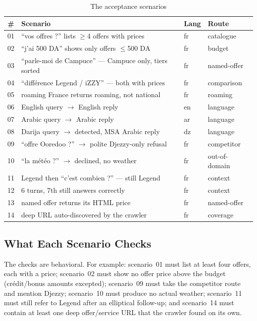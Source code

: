 \documentclass[12pt, a4paper]{report}
\newcommand{\humantext}[1]{#1}      %
\begin{document}
\begin{table}[H]
\centering
\caption{The \numTestsTotal{} acceptance scenarios}
\label{tab:scenarios}
\begin{tabularx}{\textwidth}{c X l l}
\toprule
\textbf{\#} & \textbf{Scenario} & \textbf{Lang} & \textbf{Route} \\
\midrule
01 & ``vos offres ?'' lists $\ge$4 offers with prices            & fr & catalogue \\
02 & ``j'ai 500 DA'' shows only offers $\le$500 DA               & fr & budget \\
03 & ``parle-moi de Campuce'' --- Campuce only, tiers sorted     & fr & named-offer \\
04 & ``différence Legend / iZZY'' --- both with prices           & fr & comparison \\
05 & roaming France returns roaming, not national                & fr & roaming \\
06 & English query $\rightarrow$ English reply                   & en & language \\
07 & Arabic query $\rightarrow$ Arabic reply                     & ar & language \\
08 & Darija query $\rightarrow$ detected, MSA Arabic reply       & dz & language \\
09 & ``offre Ooredoo ?'' $\rightarrow$ polite Djezzy-only refusal & fr & competitor \\
10 & ``la météo ?'' $\rightarrow$ declined, no weather           & fr & out-of-domain \\
11 & Legend then ``c'est combien ?'' --- still Legend            & fr & context \\
12 & 6 turns, 7th still answers correctly                        & fr & context \\
13 & named offer returns its HTML price                          & fr & named-offer \\
14 & deep URL auto-discovered by the crawler                     & fr & coverage \\
\bottomrule
\end{tabularx}
\end{table}

\subsection{What Each Scenario Checks}
\humantext{The checks are behavioral. For example: scenario~01 must list at least four offers, each with a price; scenario~02 must show no offer price above the budget (crédit/bonus amounts excepted); scenario~09 must take the competitor route and mention Djezzy; scenario~10 must produce no actual weather; scenario~11 must still refer to Legend after an elliptical follow-up; and scenario~14 must contain at least one deep offer/service URL that the crawler found on its own.}
\end{document}
